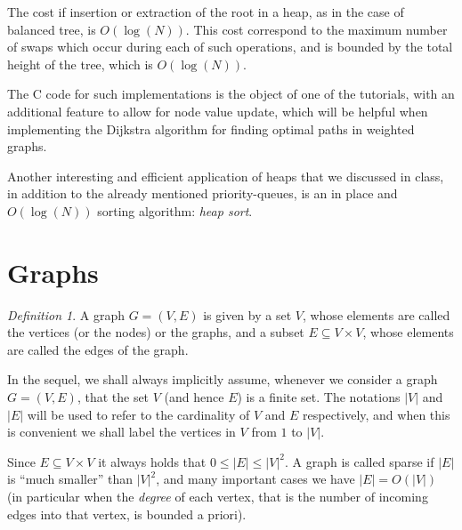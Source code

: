 \documentclass[12pt]{article}
\theoremstyle{plain}
\theoremstyle{remark}
\newtheorem*{definition}{Definition}
\begin{document}
The cost if insertion or extraction of the root in a heap, as in the case of
balanced tree, is $O(\log(N))$. This cost correspond to the maximum number of
swaps which occur during each of such operations, and is bounded by the total height of
the tree, which is $O(\log(N))$.

\medskip

The C code for such implementations is the object of one of the tutorials,
with an additional feature to allow for node value update, which will be helpful
when implementing the Dijkstra algorithm for finding optimal paths in weighted graphs.

\medskip

Another interesting and efficient application of heaps that we discussed in
class, in addition to the already mentioned priority-queues, is an in place 
and $O(\log(N))$ sorting algorithm: {\it heap sort}.


\pagebreak
\section{Graphs}

\begin{definition}A graph $G=(V,E)$ is given by a set $V$, whose elements are
called the vertices (or the nodes) or the graphs, and 
a subset $E \subseteq V \times V$, whose elements are called the edges of the
graph. \end{definition}

In the sequel, we shall always implicitly assume, whenever we consider a graph
$G=(V,E)$, that the set $V$ (and hence $E$) is a finite set. The notations $|V|$ 
and $|E|$ will be used to refer to the cardinality of $V$ and $E$ respectively, 
and when this is convenient we shall label the vertices in $V$ from $1$ to $|V|.$

Since $E \subseteq V \times V$ it always holds that $0 \leq |E| \leq |V|^2.$ 
A graph is called sparse if $|E|$ is ``much smaller'' than $|V|^2$, and many 
important cases we have $|E| = O(|V|)$ (in particular when the {\it degree}  
of each vertex, that is the number of incoming edges into that vertex, is
bounded a priori). 
\end{document}
